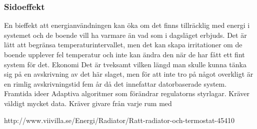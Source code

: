\subsubsection{Sidoeffekt}
En bieffekt att energianvändningen kan öka om det finns tillräcklig med energi i systemet och de boende vill ha varmare än vad som i dagsläget erbjuds. Det är lätt att begränsa temperaturintervallet, men det kan skapa irritationer om de boende upplever fel temperatur och inte kan ändra den när de har fått ett fint system för det.
Ekonomi
Det är tveksamt vilken längd man skulle kunna tänka sig på en avskrivning av det här slaget, men för att inte tro på något overkligt är en rimlig avskrivningstid fem år då det innefattar datorbaserade system.
Framtida ideer
Adaptiva algoritmer som förändrar regulatorns styrlagar. Kräver väldigt mycket data. Kräver givare från varje rum med 

http://www.viivilla.se/Energi/Radiator/Ratt-radiator-och-termostat-45410
 


